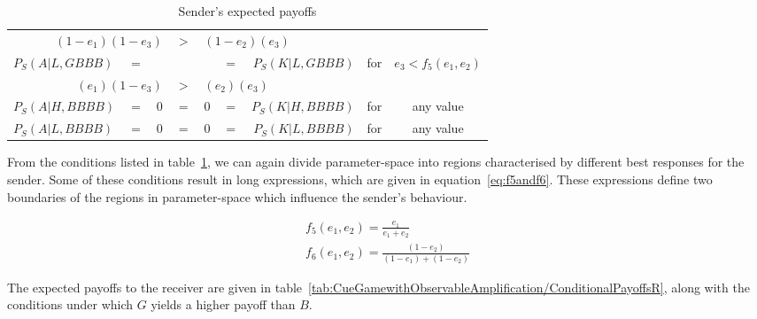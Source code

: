 \documentclass[a4paper,12pt]{article}
\numberwithin{equation}{section}
\begin{document}
\begin{table}[h]
\begin{center}
\begin{tabular}{lcccccrcc}
\multicolumn{3}{r}{$(1-e_{1})(1-e_{3})$} & $>$ & \multicolumn{3}{l}{$(1-e_{2})(e_{3})$} &
\vspace{1mm}\\
$P_{S}(A|L,GBBB)$ & $=$ & & & & $=$ & $P_{S}(K|L,GBBB)$ & \multirow{2}{*}{for} & \multirow{2}{*}{$e_{3}<f_{5}(e_{1},e_{2})$}
\vspace{-1mm}\\
\multicolumn{3}{r}{$(e_{1})(1-e_{3})$} & $>$ & \multicolumn{3}{l}{$(e_{2})(e_{3})$} &
\vspace{1mm}\\
$P_{S}(A|H,BBBB)$ & $=$ & $0$ & $=$ & $0$ & = & $P_{S}(K|H,BBBB)$ & for & any value\\
$P_{S}(A|L,BBBB)$ & $=$ & $0$ & $=$ & $0$ & = & $P_{S}(K|L,BBBB)$ & for & any value
\end{tabular}
\end{center}
\caption{Sender's expected payoffs}
\label{tab:CueGamewithObservableAmplification/ConditionalPayoffsS}
\end{table}

From the conditions listed in table~\ref{tab:CueGamewithObservableAmplification/ConditionalPayoffsS}, we can again divide parameter-space into regions characterised by different best responses for the sender. Some of these conditions result in long expressions, which are given in equation~\ref{eq:f5andf6}. These expressions define two boundaries of the regions in parameter-space which influence the sender's behaviour.

\begin{subequations}
\label{eq:f5andf6}
\begin{gather}
f_{5}(e_{1},e_{2})=\frac{e_{1}}{e_{1}+e_{2}}\\
f_{6}(e_{1},e_{2})=\frac{(1-e_{2})}{(1-e_{1})+(1-e_{2})}
\end{gather}
\end{subequations}

The expected payoffs to the receiver are given in table~\ref{tab:CueGamewithObservableAmplification/ConditionalPayoffsR}, along with the conditions under which $G$ yields a higher payoff than $B$.
\end{document}
